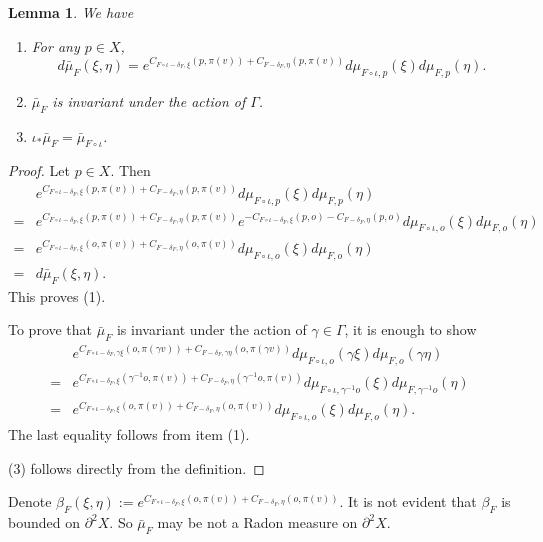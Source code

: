 \documentclass[11pt]{amsart}
\newtheorem{lemma}[theorem]{Lemma}
\theoremstyle{definition}
\def\p{{\partial}}
\def\b{\beta}
\def\c{\gamma}   \def\C{\Gamma}
\def\d{\delta}   %
\begin{document}
\begin{lemma}\label{equi}
We have
\begin{enumerate}
  \item For any $p\in X$,
  $$d \bar \mu_{F}(\xi,\eta) = e^{C_{F\circ \iota-\d_F,\xi}(p, \pi(v))+C_{F-\d_F,\eta}(p, \pi(v))}d\mu_{F\circ \iota,p}(\xi) d\mu_{F,p}(\eta).$$
  \item $\bar\mu_{F}$ is invariant under the action of $\Gamma$.
  \item $\iota_* \bar\mu_F=\bar \mu_{F\circ\iota}$.
\end{enumerate}
\end{lemma}
\begin{proof}
Let $p\in X$. Then
\begin{equation*}
\begin{aligned}
&e^{C_{F\circ \iota-\d_F,\xi}(p, \pi(v))+C_{F-\d_F,\eta}(p, \pi(v))}d\mu_{F\circ \iota,p}(\xi) d\mu_{F,p}(\eta)\\
=&e^{C_{F\circ \iota-\d_F,\xi}(p, \pi(v))+C_{F-\d_F,\eta}(p, \pi(v))}e^{-C_{F\circ \iota-\d_F,\xi}(p, o)-C_{F-\d_F,\eta}(p, o)}d\mu_{F\circ \iota,o}(\xi) d\mu_{F,o}(\eta)\\
=&e^{C_{F\circ \iota-\d_F,\xi}(o, \pi(v))+C_{F-\d_F,\eta}(o, \pi(v))}d\mu_{F\circ \iota,o}(\xi) d\mu_{F,o}(\eta)\\
=&d \bar \mu_{F}(\xi,\eta).
\end{aligned}
\end{equation*}
This proves (1).

To prove that $\bar\mu_{F}$ is invariant under the action of $\c\in \Gamma$, it is enough to show
\begin{equation*}
\begin{aligned}
&e^{C_{F\circ \iota-\d_F,\c\xi}(o, \pi(\c v))+C_{F-\d_F,\c\eta}(o, \pi(\c v))}d\mu_{F\circ \iota,o}(\c \xi) d\mu_{F,o}(\c\eta)\\
=&e^{C_{F\circ \iota-\d_F,\xi}(\c^{-1}o, \pi(v))+C_{F-\d_F,\eta}(\c^{-1}o, \pi(v))}d\mu_{F\circ \iota,\c^{-1}o}(\xi) d\mu_{F,\c^{-1}o}(\eta)\\
=&e^{C_{F\circ \iota-\d_F,\xi}(o, \pi(v))+C_{F-\d_F,\eta}(o, \pi(v))}d\mu_{F\circ \iota,o}(\xi) d\mu_{F,o}(\eta).
\end{aligned}
\end{equation*}
The last equality follows from item (1). 

(3) follows directly from the definition.
\end{proof}

Denote $\b_F(\xi,\eta):= e^{C_{F\circ \iota-\d_F,\xi}(o, \pi(v))+C_{F-\d_F,\eta}(o, \pi(v))}$. It is not evident that $\b_F$ is bounded on $\p^2X$. So $\bar\mu_F$ may be not a Radon measure on $\p^2X$.
\end{document}
